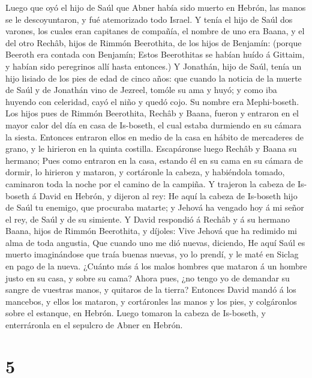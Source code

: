  Luego que oyó el hijo de Saúl que Abner había sido muerto
en Hebrón, las manos se le descoyuntaron, y fué atemorizado todo Israel.
 Y tenía el hijo de Saúl dos varones, los cuales eran
capitanes de compañía, el nombre de uno era Baana, y el del otro Rechâb,
hijos de Rimmón Beerothita, de los hijos de Benjamín: (porque Beeroth
era contada con Benjamín;  Estos Beerothitas se habían
huído á Gittaim, y habían sido peregrinos allí hasta entonces.)
 Y Jonathán, hijo de Saúl, tenía un hijo lisiado de los
pies de edad de cinco años: que cuando la noticia de la muerte de Saúl y
de Jonathán vino de Jezreel, tomóle su ama y huyó; y como iba huyendo
con celeridad, cayó el niño y quedó cojo. Su nombre era Mephi-boseth.
 Los hijos pues de Rimmón Beerothita, Rechâb y Baana,
fueron y entraron en el mayor calor del día en casa de Is-boseth, el
cual estaba durmiendo en su cámara la siesta.  Entonces
entraron ellos en medio de la casa en hábito de mercaderes de grano, y
le hirieron en la quinta costilla. Escapáronse luego Rechâb y Baana su
hermano;  Pues como entraron en la casa, estando él en su
cama en su cámara de dormir, lo hirieron y mataron, y cortáronle la
cabeza, y habiéndola tomado, caminaron toda la noche por el camino de la
campiña.  Y trajeron la cabeza de Is-boseth á David en
Hebrón, y dijeron al rey: He aquí la cabeza de Is-boseth hijo de Saúl tu
enemigo, que procuraba matarte; y Jehová ha vengado hoy á mi señor el
rey, de Saúl y de su simiente.  Y David respondió á Rechâb
y á su hermano Baana, hijos de Rimmón Beerothita, y díjoles: Vive Jehová
que ha redimido mi alma de toda angustia,  Que cuando uno
me dió nuevas, diciendo, He aquí Saúl es muerto imaginándose que traía
buenas nuevas, yo lo prendí, y le maté en Siclag en pago de la nueva.
 ¿Cuánto más á los malos hombres que mataron á un hombre
justo en su casa, y sobre su cama? Ahora pues, ¿no tengo yo de demandar
su sangre de vuestras manos, y quitaros de la tierra? 
Entonces David mandó á los mancebos, y ellos los mataron, y cortáronles
las manos y los pies, y colgáronlos sobre el estanque, en Hebrón. Luego
tomaron la cabeza de Is-boseth, y enterráronla en el sepulcro de Abner
en Hebrón.

\hypertarget{section-4}{%
\section{5}\label{section-4}}

